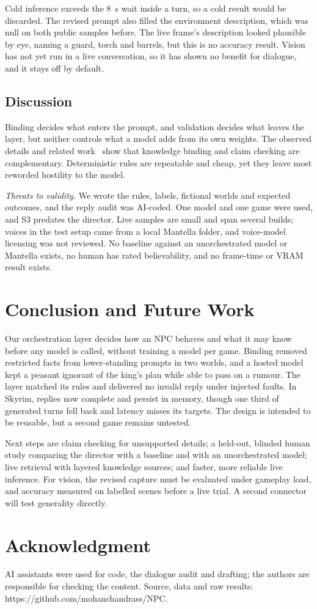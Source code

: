 \documentclass[conference]{IEEEtran}
\begin{document}
Cold inference exceeds the 8~s wait inside a turn, so a cold result would be discarded. The revised prompt also filled the environment description, which was null on both public samples before. The live frame's description looked plausible by eye, naming a guard, torch and barrels, but this is no accuracy result. Vision has not yet run in a live conversation, so it has shown no benefit for dialogue, and it stays off by default.

\subsection{Discussion}
Binding decides what enters the prompt, and validation decides what leaves the layer, but neither controls what a model adds from its own weights. The observed details and related work~\cite{sadeq2024,ahn2024} show that knowledge binding and claim checking are complementary. Deterministic rules are repeatable and cheap, yet they leave most reworded hostility to the model.

\textit{Threats to validity.} We wrote the rules, labels, fictional worlds and expected outcomes, and the reply audit was AI-coded. One model and one game were used, and S3 predates the director. Live samples are small and span several builds; voices in the test setup came from a local Mantella folder, and voice-model licensing was not reviewed. No baseline against an unorchestrated model or Mantella exists, no human has rated believability, and no frame-time or VRAM result exists.

\section{Conclusion and Future Work}
Our orchestration layer decides how an NPC behaves and what it may know before any model is called, without training a model per game. Binding removed restricted facts from lower-standing prompts in two worlds, and a hosted model kept a peasant ignorant of the king's plan while able to pass on a rumour. The layer matched its rules and delivered no invalid reply under injected faults. In Skyrim, replies now complete and persist in memory, though one third of generated turns fell back and latency misses its targets. The design is intended to be reusable, but a second game remains untested.

Next steps are claim checking for unsupported details; a held-out, blinded human study comparing the director with a baseline and with an unorchestrated model; live retrieval with layered knowledge sources; and faster, more reliable live inference. For vision, the revised capture must be evaluated under gameplay load, and accuracy measured on labelled scenes before a live trial. A second connector will test generality directly.

\section*{Acknowledgment}
AI assistants were used for code, the dialogue audit and drafting; the authors are responsible for checking the content. Source, data and raw results: https://github.com/mohanchandrass/NPC.



\end{document}
